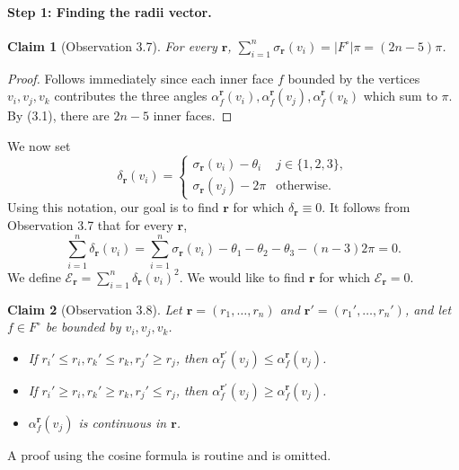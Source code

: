 \documentclass[UTF8,11pt]{ctexart}
\newtheorem*{claim}{Claim}
\theoremstyle{definition}
\begin{document}
\paragraph{Step 1: Finding the radii vector.}
\begin{claim}[Observation 3.7]
For every $\mathbf r$, $\sum_{i=1}^n\sigma_{\mathbf r}(v_i)=|F^\circ|\pi=(2n-5)\pi$.
\end{claim}
\begin{proof}
Follows immediately since each inner face $f$ bounded by the vertices $v_i,v_j,v_k$ contributes the three angles $\alpha_f^{\mathbf r}(v_i),\alpha_f^{\mathbf r}(v_j),\alpha_f^{\mathbf r}(v_k)$ which sum to $\pi$. By (3.1), there are $2n-5$ inner faces.
\end{proof}
We now set
\[
\delta_{\mathbf r}(v_i)=\begin{cases}\sigma_{\mathbf r}(v_i)-\theta_i&j\in\{1,2,3\},\\\sigma_{\mathbf r}(v_j)-2\pi&\text{otherwise}.\end{cases}\tag{3.3}
\]
Using this notation, our goal is to find $\mathbf r$ for which $\delta_{\mathbf r}\equiv0$. It follows from Observation 3.7 that for every $\mathbf r$,
\[
\sum_{i=1}^n\delta_{\mathbf r}(v_i)=\sum_{i=1}^n\sigma_{\mathbf r}(v_i)-\theta_1-\theta_2-\theta_3-(n-3)2\pi=0.\tag{3.4}
\]
We define $\mathcal E_{\mathbf r}=\sum_{i=1}^n\delta_{\mathbf r}(v_i)^2$. We would like to find $\mathbf r$ for which $\mathcal E_{\mathbf r}=0$.
\begin{claim}[Observation 3.8]
Let $\mathbf r=(r_1,\ldots,r_n)$ and $\mathbf r'=(r_1',\ldots,r_n')$, and let $f\in F^\circ$ be bounded by $v_i,v_j,v_k$.
\begin{itemize}
\item If $r_i'\le r_i,r_k'\le r_k,r_j'\ge r_j$, then $\alpha_f^{\mathbf r'}(v_j)\le\alpha_f^{\mathbf r}(v_j)$.
\item If $r_i'\ge r_i,r_k'\ge r_k,r_j'\le r_j$, then $\alpha_f^{\mathbf r'}(v_j)\ge\alpha_f^{\mathbf r}(v_j)$.
\item $\alpha_f^{\mathbf r}(v_j)$ is continuous in $\mathbf r$.
\end{itemize}
\end{claim}
A proof using the cosine formula is routine and is omitted.
\end{document}
